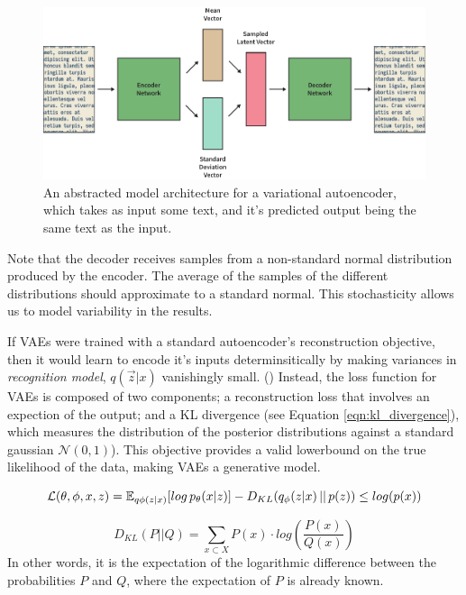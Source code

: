 \documentclass[12pt,twoside]{report}
\begin{document}
\begin{figure}[!ht]
	\centering
	\includegraphics[width=150mm]{diagrams/variational_autoencoders.pdf}
	\caption{An abstracted model architecture for a variational autoencoder, which takes as input some text, and it's predicted output being the same text as the input.\label{vae}}
  \end{figure}

Note that the decoder receives samples from a non-standard normal distribution produced by the encoder. The average of the samples of the different distributions should approximate to a standard normal. This stochasticity allows us to model variability in the results. 

If VAEs were trained with a standard autoencoder's reconstruction objective, then it would learn to encode it's inputs determinsitically by making variances in \textit{recognition model}, $q(\overrightarrow{z}|x)$ vanishingly small. (\cite{raiko_techniques_2014}) Instead, the loss function for VAEs is composed of two components; a reconstruction loss that involves an expection of the output; and a KL divergence (see Equation \ref{eqn:kl_divergence}), which measures the distribution of the posterior distributions against a standard gaussian $ \mathcal{N}(0,1)$). This objective provides a valid lowerbound on the true likelihood of the data, making VAEs a generative model.
  
\begin{equation}
	\label{eqn:elbo}
	\mathcal{L}(\theta, \phi, x, z) = \mathbb{E}_{q \phi (z|x)}[log \thinspace p_{\theta}(x|z)] - D_{KL}(q_{\phi}(z|x)\thinspace||\thinspace p(z)) \leq log (p(x))
\end{equation}

\begin{equation}
	\label{eqn:kl_divergence}
D_{KL}(P ||Q) = \sum_{x \subset X} P(x) \cdot log (\frac{P(x)}{Q(x)})
\end{equation}
In other words, it is the expectation of the logarithmic difference between the probabilities $P$ and $Q$, where the expectation of $P$ is already known.
\end{document}
